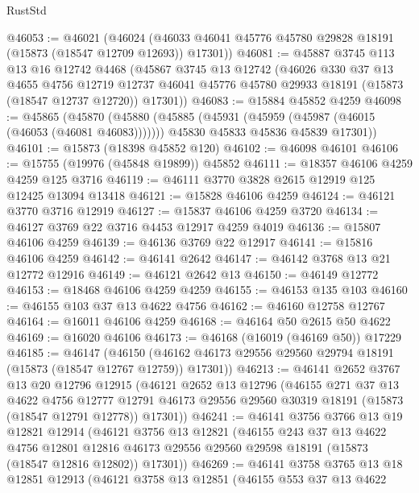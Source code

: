 \begin{lexlean}{RustStd}
\begin{coremodule}
@46053 := @46021
    (@46024 (@46033 @46041 @45776 @45780 @29828 @18191 (@15873 (@18547 @12709 @12693)) @17301))
@46081 := @45887
    @3745
    @113
    @13
    @16
    @12742
    @4468
    (@45867
      @3745
      @13
      @12742
      (@46026
        @330
        @37
        @13
        @4655
        @4756
        @12719
        @12737
        @46041
        @45776
        @45780
        @29933
        @18191
        (@15873 (@18547 @12737 @12720))
        @17301))
@46083 := @15884 @45852 @4259
@46098 := @45865
    (@45870
      (@45880
        (@45885 (@45931 (@45959 (@45987 (@46015 (@46053 (@46081 @46083)))))))
        @45830
        @45833
        @45836
        @45839
        @17301))
@46101 := @15873 (@18398 @45852 @120)
@46102 := @46098 @46101
@46106 := @15755 (@19976 (@45848 @19899)) @45852
@46111 := @18357 @46106 @4259 @4259 @125 @3716
@46119 := @46111 @3770 @3828 @2615 @12919 @125 @12425 @13094 @13418
@46121 := @15828 @46106 @4259
@46124 := @46121 @3770 @3716 @12919
@46127 := @15837 @46106 @4259 @3720
@46134 := @46127 @3769 @22 @3716 @4453 @12917 @4259 @4019
@46136 := @15807 @46106 @4259
@46139 := @46136 @3769 @22 @12917
@46141 := @15816 @46106 @4259
@46142 := @46141 @2642
@46147 := @46142 @3768 @13 @21 @12772 @12916
@46149 := @46121 @2642 @13
@46150 := @46149 @12772
@46153 := @18468 @46106 @4259 @4259
@46155 := @46153 @135 @103
@46160 := @46155 @103 @37 @13 @4622 @4756
@46162 := @46160 @12758 @12767
@46164 := @16011 @46106 @4259
@46168 := @46164 @50 @2615 @50 @4622
@46169 := @16020 @46106
@46173 := @46168 (@16019 (@46169 @50)) @17229
@46185 := @46147
    (@46150 (@46162 @46173 @29556 @29560 @29794 @18191 (@15873 (@18547 @12767 @12759)) @17301))
@46213 := @46141
    @2652
    @3767
    @13
    @20
    @12796
    @12915
    (@46121
      @2652
      @13
      @12796
      (@46155
        @271
        @37
        @13
        @4622
        @4756
        @12777
        @12791
        @46173
        @29556
        @29560
        @30319
        @18191
        (@15873 (@18547 @12791 @12778))
        @17301))
@46241 := @46141
    @3756
    @3766
    @13
    @19
    @12821
    @12914
    (@46121
      @3756
      @13
      @12821
      (@46155
        @243
        @37
        @13
        @4622
        @4756
        @12801
        @12816
        @46173
        @29556
        @29560
        @29598
        @18191
        (@15873 (@18547 @12816 @12802))
        @17301))
@46269 := @46141
    @3758
    @3765
    @13
    @18
    @12851
    @12913
    (@46121
      @3758
      @13
      @12851
      (@46155
        @553
        @37
        @13
        @4622

\end{coremodule}
\end{lexlean}
